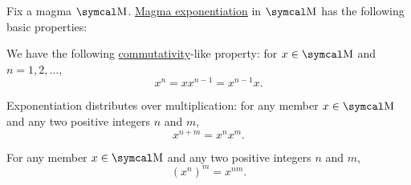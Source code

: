 \begin{proposition}\label{thm:magma_exponentiation_properties}
  Fix a magma \( \CM \). \hyperref[def:magma/exponentiation]{Magma exponentiation} in \( \CM \) has the following basic properties:

  \begin{PropEnum}
     We have the following \hyperref[def:magma/commutative]{commutativity}-like property: for \( x \in \CM \) and \( n = 1, 2, \ldots \),
    \begin{equation}\label{eq:thm:magma_exponentiation_properties/commutativity}
      x^n = x x^{n-1} = x^{n-1} x.
    \end{equation}

     Exponentiation distributes over multiplication: for any member \( x \in \CM \) and any two positive integers \( n \) and \( m \),
    \begin{equation}\label{eq:thm:magma_exponentiation_properties/multiplication}
      x^{n + m} = x^n x^m.
    \end{equation}

     For any member \( x \in \CM \) and any two positive integers \( n \) and \( m \),
    \begin{equation}\label{eq:thm:magma_exponentiation_properties/repeated}
      (x^n)^m = x^{nm}.
    \end{equation}
  \end{PropEnum}
\end{proposition}
